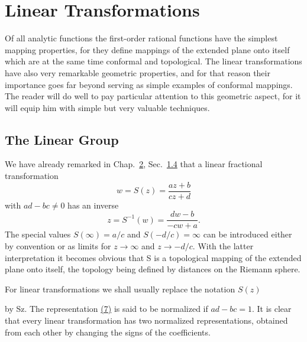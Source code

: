 \setcounter{section}{2}\section{Linear Transformations}\label{sec:3.3}
Of all analytic functions the first-order rational functions have the simplest mapping properties, for they define mappings of the extended plane onto itself which are at the same time conformal and topological. The linear transformations have also very remarkable geometric properties, and for that reason their importance goes far beyond serving as simple examples of conformal mappings. The reader will do well to pay particular attention to this geometric aspect, for it will equip him with simple but very valuable techniques.

\setcounter{section}{3}\setcounter{subsection}{0}\subsection{The Linear Group}\label{sec:3.3.1}
We have already remarked in Chap.~\hyperref[chap:2]{2}, Sec.~\hyperref[sec:2.1.4]{1.4} that a linear fractional transformation
\begin{equation*}
w = S (z) = \frac {a z + b}{c z + d}\tag{7}\label{eq:3.7}
\end{equation*}
with $ad - bc \neq 0$ has an inverse
\begin{equation*}
z = S ^ {- 1} (w) = \frac {d w - b}{- c w + a}.
\end{equation*}
The special values $S(\infty) = a/c$ and $S(-d/c) = \infty$ can be introduced either by convention or as limits for $z \to \infty$ and $z \to -d/c$. With the latter interpretation it becomes obvious that S is a topological mapping of the extended plane onto itself, the topology being defined by distances on the Riemann sphere.

For linear transformations we shall usually replace the notation $S(z)$


by Sz. The representation \hyperref[eq:3.7]{(7)} is said to be normalized if $ad - bc = 1$. It is clear that every linear transformation has two normalized representations, obtained from each other by changing the signs of the coefficients.

